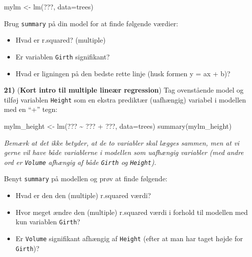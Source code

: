 \documentclass[
]{book}
\newenvironment{Shaded}{\begin{snugshade}}{\end{snugshade}}
\newcommand{\AttributeTok}[1]{\textcolor[rgb]{0.77,0.63,0.00}{#1}}
\newcommand{\FunctionTok}[1]{\textcolor[rgb]{0.00,0.00,0.00}{#1}}
\newcommand{\NormalTok}[1]{#1}
\newcommand{\OtherTok}[1]{\textcolor[rgb]{0.56,0.35,0.01}{#1}}
\newcommand{\SpecialCharTok}[1]{\textcolor[rgb]{0.00,0.00,0.00}{#1}}
\providecommand{\tightlist}{%
  \setlength{\itemsep}{0pt}\setlength{\parskip}{0pt}}
\begin{document}
\begin{Shaded}
\begin{Highlighting}[]
\NormalTok{mylm }\OtherTok{\textless{}{-}} \FunctionTok{lm}\NormalTok{(???, }\AttributeTok{data=}\NormalTok{trees) }
\end{Highlighting}
\end{Shaded}

Brug \texttt{summary} på din model for at finde følgende værdier:

\begin{itemize}
\tightlist
\item
  Hvad er r.squared? (multiple)
\item
  Er variablen \texttt{Girth} signifikant?
\item
  Hvad er ligningen på den bedste rette linje (husk formen y = ax + b)?
\end{itemize}

\textbf{21)} (\textbf{Kort intro til multiple lineær regression}) Tag ovenstående model og tilføj variablen \texttt{Height} som en ekstra prediktær (uafhængig) variabel i modellen med en ``+'' tegn:

\begin{Shaded}
\begin{Highlighting}[]
\NormalTok{mylm\_height }\OtherTok{\textless{}{-}} \FunctionTok{lm}\NormalTok{(??? }\SpecialCharTok{\textasciitilde{}}\NormalTok{ ??? }\SpecialCharTok{+}\NormalTok{ ???, }\AttributeTok{data=}\NormalTok{trees) }
\FunctionTok{summary}\NormalTok{(mylm\_height)}
\end{Highlighting}
\end{Shaded}

\emph{Bemærk at det ikke betyder, at de to variabler skal lægges sammen, men at vi gerne vil have både variablerne i modellen som uafhængig variabler (med andre ord er \texttt{Volume} afhængig af både \texttt{Girth} og \texttt{Height}).}

Benyt \texttt{summary} på modellen og prøv at finde følgende:

\begin{itemize}
\tightlist
\item
  Hvad er den den (multiple) r.squared værdi?
\item
  Hvor meget ændre den (multiple) r.squared værdi i forhold til modellen med kun variablen \texttt{Girth}?
\item
  Er \texttt{Volume} signifikant afhængig af \texttt{Height} (efter at man har taget højde for \texttt{Girth})?
\end{itemize}
\end{document}
